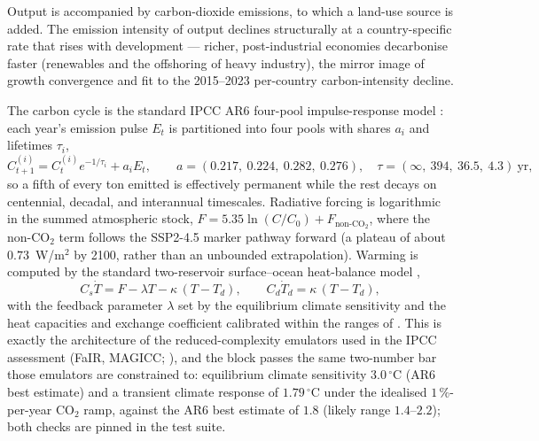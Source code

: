 \documentclass[a4paper,fleqn]{cas-sc}
\newcommand{\response}[1]{\medskip\noindent\textcolor{blue}{\small\itshape [Addressed: #1]}\medskip}
\begin{document}

Output is accompanied by carbon-dioxide emissions, to which a land-use source is added. The emission
intensity of output declines structurally at a country-specific rate that rises with development ---
richer, post-industrial economies decarbonise faster (renewables and the offshoring of heavy
industry), the mirror image of growth convergence and fit to the 2015--2023 per-country
carbon-intensity decline.

The carbon cycle is the standard IPCC AR6 four-pool impulse-response model
\citep{joos2013}: each year's emission pulse $E_t$ is partitioned into four pools with shares
$a_i$ and lifetimes $\tau_i$,
\begin{equation}
C^{(i)}_{t+1} = C^{(i)}_t e^{-1/\tau_i} + a_i E_t, \qquad
a = (0.217,\ 0.224,\ 0.282,\ 0.276), \quad
\tau = (\infty,\ 394,\ 36.5,\ 4.3)\ \text{yr},
\label{eq:pools}
\end{equation}
so a fifth of every ton emitted is effectively permanent while the rest decays on centennial,
decadal, and interannual timescales. Radiative forcing is logarithmic in the summed atmospheric
stock, $F = 5.35 \ln (C/C_0) + F_{\mathrm{non\text{-}CO_2}}$, where the non-CO$_2$ term follows
the SSP2-4.5 marker pathway forward (a plateau of about $0.73$~W/m$^2$ by 2100, rather than an
unbounded extrapolation). Warming is computed by the standard two-reservoir surface--ocean
heat-balance model \citep{geoffroy2013},
\begin{equation}
C_s \dot T = F - \lambda T - \kappa\,(T - T_d), \qquad
C_d \dot T_d = \kappa\,(T - T_d),
\label{eq:ebm}
\end{equation}
with the feedback parameter $\lambda$ set by the equilibrium climate sensitivity and the heat
capacities and exchange coefficient calibrated within the ranges of \citet{geoffroy2013}. This is
exactly the architecture of the reduced-complexity emulators used in the IPCC assessment (FaIR,
MAGICC; \citealp{smith2018fair,meinshausen2011}), and the block passes the same two-number bar
those emulators are constrained to: equilibrium climate sensitivity $3.0\,^\circ$C (AR6 best
estimate) and a transient climate response of $1.79\,^\circ$C under the idealised $1\,\%$-per-year
CO$_2$ ramp, against the AR6 best estimate of $1.8$ (likely range $1.4$--$2.2$); both checks are
pinned in the test suite.
\end{document}
